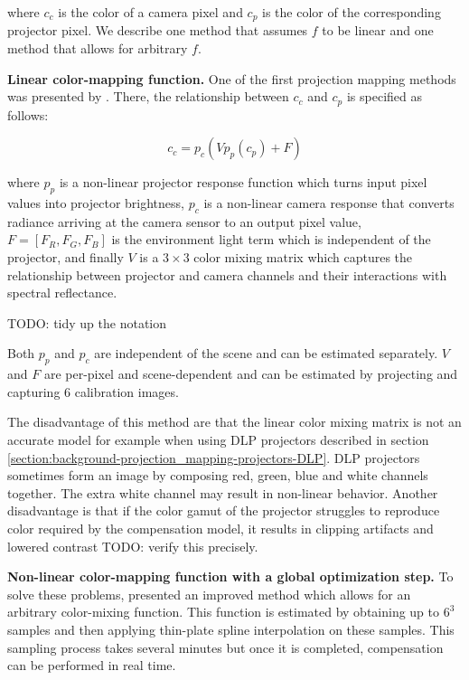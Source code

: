 where \(c_c\) is the color of a camera pixel and \(c_p\) is the color of the corresponding projector pixel. We describe one method that assumes \(f\) to be linear and one method that allows for arbitrary \(f\).

\textbf{Linear color-mapping function.} One of the first projection mapping methods was presented by \citet{Grossberg2004}. There, the relationship between \(c_c\) and \(c_p\) is specified as follows:

\begin{equation}
    \label{eq:linear_color_mapping}
    c_c = p_c(V p_p(c_p) + F)
\end{equation}

where \(p_p\) is a non-linear projector response function which turns input pixel values into projector brightness, \(p_c\) is a non-linear camera response that converts radiance arriving at the camera sensor to an output pixel value, \(F = [F_R, F_G, F_B]\) is the environment light term which is independent of the projector, and finally \(V\) is a \(3 \times 3\) color mixing matrix which captures the relationship between projector and camera channels and their interactions with spectral reflectance.

{\color{red} TODO: tidy up the notation}

Both \(p_p\) and \(p_c\) are independent of the scene and can be estimated separately. \(V\) and \(F\) are per-pixel and scene-dependent and can be estimated by projecting and capturing 6 calibration images.

The disadvantage of this method are that the linear color mixing matrix is not an accurate model for example when using DLP projectors described in section \ref{section:background-projection_mapping-projectors-DLP}. DLP projectors sometimes form an image by composing red, green, blue and white channels together. The extra white channel may result in non-linear behavior. Another disadvantage is that if the color gamut of the projector struggles to reproduce color required by the compensation model, it results in clipping artifacts and lowered contrast {\color{red} TODO: verify this precisely}.

\textbf{Non-linear color-mapping function with a global optimization step.} To solve these problems, \citet{Grundhofer2015} presented an improved method which allows for an arbitrary color-mixing function. This function is estimated by obtaining up to \(6^3\) samples and then applying thin-plate spline interpolation on these samples. This sampling process takes several minutes but once it is completed, compensation can be performed in real time.

